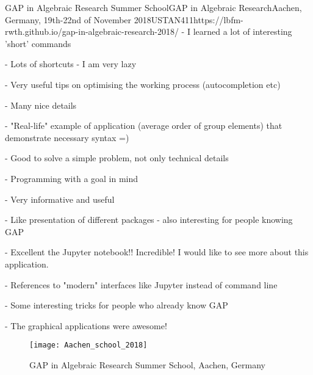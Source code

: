 \begin{event}{GAP in Algebraic Research Summer School}{GAP in Algebraic Research}{Aachen, Germany, 19th-22nd of November 2018}{USTAN}{41}{1}{https://lbfm-rwth.github.io/gap-in-algebraic-research-2018/}
- I learned a lot of interesting 'short' commands

- Lots of shortcuts - I am very lazy

- Very useful tips on optimising the working process (autocompletion etc)

- Many nice details

- "Real-life" example of application (average order of group elements) that demonstrate necessary syntax =)

- Good to solve a simple problem, not only technical details

- Programming with a goal in mind

- Very informative and useful

- Like presentation of different packages - also interesting for people knowing GAP

- Excellent the Jupyter notebook!! Incredible! I would like to see more about this application.

- References to "modern" interfaces like Jupyter instead of command line

- Some interesting tricks for people who already know GAP

- The graphical applications were awesome!

\begin{figure}[ht]
  \texttt{[image: Aachen\_school\_2018]}
  \caption*{GAP in Algebraic Research Summer School, Aachen, Germany}
\end{figure}

\end{event}

